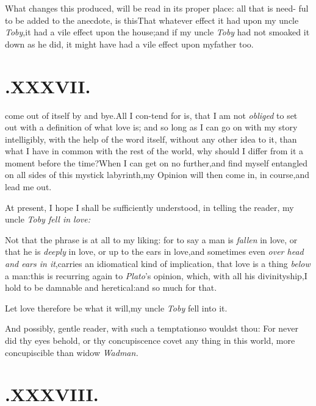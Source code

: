 \documentclass{article}
\begin{document}
What changes this produced, will be read in its proper place:
all that is need- ful to be added to the anecdote, is
this\break\tsh That whatever effect it had upon my uncle
\textit{Toby},\tsh it had a vile effect upon the
house;\tsh and if my uncle \textit{Toby} had not smoaked it
down as he did, it might have had a vile effect upon my\break father
too.

\medskip

\section{.\enspace XXXVII.}

 come out of itself\break
by and bye.\tsk All I con-\break tend for is, that I am
not \textit{obliged} to set out with a definition of what love is; and so
long as I can go on with my story intelligibly, with the help of
the word itself, without any other idea to it, than what I have in
common with the rest of the world, why should I differ from it
a moment before the time?\tsh When I
can get
on no further,\tsk and find myself entangled on all sides of this
mystick labyrinth,\tsk my Opinion will then come in, in
course,\tsk and lead me out.

At present, I hope I shall be suffici\-ently understood, in
telling the reader, my uncle \textit{Toby fell in love:}

\tsk Not that the phrase is at all to my liking: for to say a
man is \textit{fallen} in love,\break
\tsk or that he is \textit{deeply} in love,
\tsk or up to the ears in love,\tsk and sometimes even
\textit{over head and ears in it},\tsk carries an idiomatical kind
of implication, that love is a thing \textit{below} a man:\tsk this
is recurring again to \textit{Plato}’s opinion, which, with all
his divinityship,\tsk I hold to be damnable and
heretical:\tsk and so much for that.

Let love therefore be what it will,\tsk my uncle \textit{Toby}
fell into it.

\tsh And possibly, gentle reader, with such a
temptation\tsk so wouldst thou: For never did thy eyes behold, or
thy concupiscence covet any thing in this world, more concupiscible than widow
\textit{Wadman.}

\section{.\enspace XXXVIII.}
\end{document}
